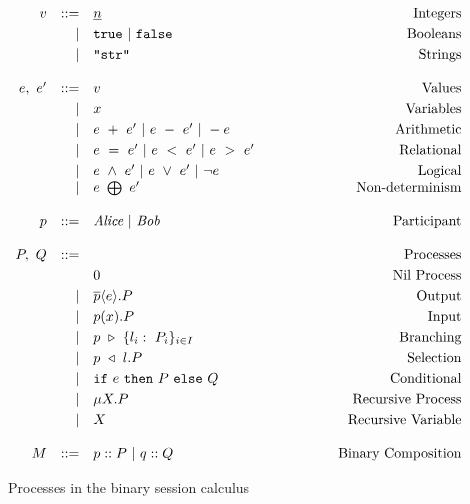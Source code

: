 \documentclass[12pt,twoside]{report}
\newcommand{\white}{\ \ \ \ \ \ \ \ \ \ \ \ }
\begin{document}
\begin{figure}[h]
    \centering
    \begin{equation*}
    \centering
    \begin{array}{rrlcr}
        v & ::= & \underline{n} & \white & \text{Integers} \\[2.75pt]
              & |  & \texttt{true}\ |\ \texttt{false} & \white & \text{Booleans} \\[2.75pt]
              & | & \texttt{"str"} & \white & \text{Strings} \\\\
        e,\ e' & ::= & v & \white & \text{Values} \\[2.75pt]
              & |  & x & \white & \text{Variables} \\[2.75pt]
              & | & e\ +\ e'\ |\ e\ -\ e'\ |\ -e & \white & \text{Arithmetic} \\[2.75pt]
              & | & e\ =\ e'\ |\ e\ <\ e'\ |\ e\ >\ e' & \white & \text{Relational} \\[2.75pt]
              & | & e\ \land\ e'\ |\ e\ \lor\ e'\ |\ \lnot e & \white & \text{Logical} \\
              & | & e\ \bigoplus\ e' & \white & \text{Non-determinism}\\\\
        
        
        p & ::= & \textit{Alice}\ |\ \textit{Bob} & \white & \text{Participant}\\\\
        P,\ Q & ::= && \white & \text{Processes} \\[2.75pt]
             &   & 0 & \white & \text{Nil\ Process}  \\[2.75pt]
             & | & \overline{p} \langle e \rangle.P & \white & \text{Output} \\[2.75pt] 
             & | & p(x).P & \white & \text{Input}\\[2.75pt]
             & | & p\ \triangleright\ \{l_i:\ P_i\}_{i\in I}& \white & \text{Branching}\\[2.75pt]
             & | & p\ \triangleleft\ l.P& \white & \text{Selection} \\[2.75pt]
             & | & \texttt{if}\ e\ \texttt{then}\ P\ \texttt{else}\ Q & \white & \text{Conditional} \\[2.75pt]
             & | & \mu X.P & \white  & \text{Recursive}\ \text{Process} \\[2.75pt]
             & | & X & \white  & \text{Recursive\ Variable} \\\\
             
        M & ::= & p :: P\ |\ q :: Q & \white & \text{Binary\ Composition}
        \end{array}
    \end{equation*}
    \caption{Processes in the binary session calculus}
    \label{bst_session_calc}
\end{figure}{}
\end{document}

